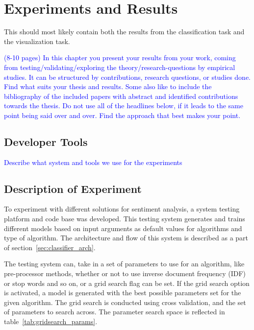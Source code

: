 \chapter{Experiments and Results}

This should most likely contain both the results from the classification task and the visualization task.

\textcolor{blue}{(8-10 pages) In this chapter you present your results from your work, coming from 
testing/validating/exploring the theory/research-questions by empirical studies. It can be structured by contributions, 
research questions, or studies done. Find what suits your thesis and results. Some also like to include the 
bibliography of the included papers with abstract and identified contributions towards the thesis. Do not use all of 
the headlines below, if it leads to the same point being said over and over. Find the approach that best makes your 
point.}

\section{Developer Tools}
\textcolor{blue}{Describe what system and tools we use for the experiments}


\section{Description of Experiment}
To experiment with different solutions for sentiment analysis, a system testing platform and code base was developed. This testing system generates and trains different models based on input arguments as default values for algorithms and type of algorithm. The architecture and flow of this system is described as a part of section~\ref{sec:classifier_arch}.

The testing system can, take in a set of parameters to use for an algorithm, like pre-processor methods, whether or not to use inverse document frequency (IDF) or stop words and so on, or a grid search flag can be set. If the grid search option is activated, a model is generated with the best possible parameters set for the given algorithm. The grid search is conducted using cross validation, and the set of parameters to search across. The parameter search space is reflected in table~\ref{tab:gridsearch_params}.

